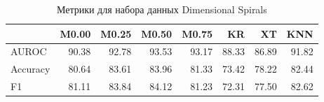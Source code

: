 \begin{table}
\caption{Метрики для набора данных Dimensional Spirals}
\label{tab:Dimensional Spirals}
\begin{tabular}{lrrrrrrr}
\toprule
 & M0.00 & M0.25 & M0.50 & M0.75 & KR & XT & KNN \\
\midrule
AUROC & 90.38 & 92.78 & 93.53 & 93.17 & 88.33 & 86.89 & 91.82 \\
Accuracy & 80.64 & 83.61 & 83.96 & 81.33 & 73.42 & 78.22 & 82.44 \\
F1 & 81.11 & 83.84 & 84.12 & 81.23 & 72.31 & 77.50 & 82.62 \\
\bottomrule
\end{tabular}
\end{table}

